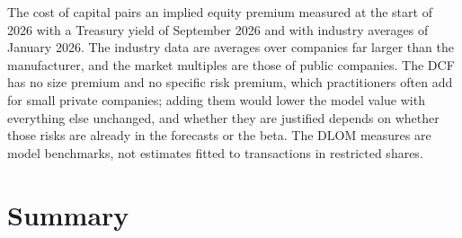 \begin{chapterrefs}
The cost of capital pairs an implied equity premium measured at the start of 2026 with a Treasury
yield of September 2026 and with industry averages of January 2026. The industry data are averages
over companies far larger than the manufacturer, and the market multiples are those of public
companies. The DCF has no size premium and no specific risk premium, which practitioners often add
for small private companies; adding them would lower the model value with everything else unchanged,
and whether they are justified depends on whether those risks are already in the forecasts or the
beta. The DLOM measures are model benchmarks, not estimates fitted to transactions in restricted shares.

\FloatBarrier
\section{Summary}
\label{sec11:summary}


\end{chapterrefs}
